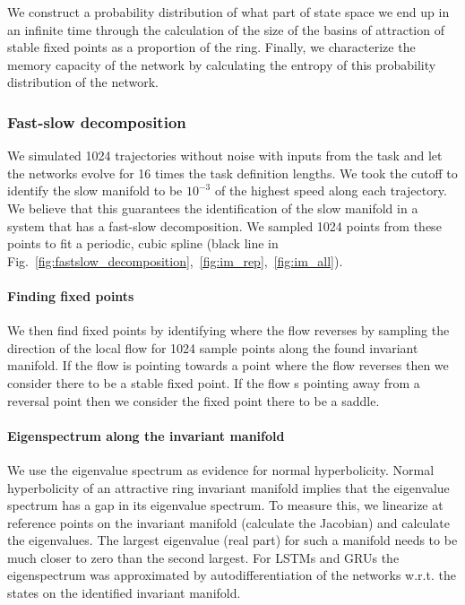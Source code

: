 \documentclass{article} %
\newcounter{ct}
\theoremstyle{definition}
\theoremstyle{remark}
\begin{document}
We construct a probability distribution of what part of state space we end up in an infinite time through the calculation of the size of the basins of attraction of stable fixed points as a proportion of the ring.
Finally, we characterize the memory capacity of the network by calculating the entropy of this probability distribution of the network.


 \subsubsection{Fast-slow decomposition}\label{sec:fsdecmethod}
 We simulated 1024 trajectories without noise with inputs from the task and let the networks evolve for 16 times the task definition lengths.
 We took the cutoff to identify the slow manifold to be \(10^{-3}\) of the highest speed along each trajectory.
 We believe that this guarantees the identification of the slow manifold in a system that has a fast-slow decomposition.
 We sampled 1024 points from these points to fit a periodic, cubic spline (black line in Fig.~\ref{fig:fastslow_decomposition},~\ref{fig:im_rep},~\ref{fig:im_all}).
 

\paragraph{Finding fixed points}
 We then find fixed points by identifying where the flow reverses by sampling the direction of the local flow for 1024 sample points along the found invariant manifold.
If the flow is pointing towards a point where the flow reverses then we consider there to be a stable fixed point.
If the flow s pointing away from a reversal point then we consider the fixed point there to be a saddle.



\paragraph{Eigenspectrum along the invariant manifold}
We use the eigenvalue spectrum as evidence for normal hyperbolicity.
Normal hyperbolicity of an attractive ring invariant manifold implies that the eigenvalue spectrum has a gap in its eigenvalue spectrum.
To measure this, we linearize at reference points on the invariant manifold (calculate the Jacobian) and calculate the eigenvalues.
The largest  eigenvalue (real part) for such a manifold needs to be much closer to zero than the second largest.
For LSTMs and GRUs the  eigenspectrum was approximated by autodifferentiation of the networks w.r.t. the states on the identified invariant manifold.
\end{document}
